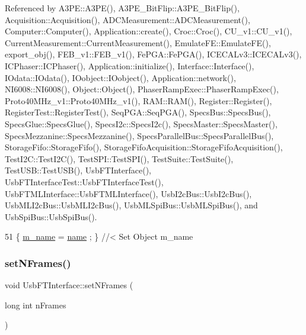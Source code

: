 Referenced by A3\+P\+E\+::\+A3\+P\+E(), A3\+P\+E\+\_\+\+Bit\+Flip\+::\+A3\+P\+E\+\_\+\+Bit\+Flip(), Acquisition\+::\+Acquisition(), A\+D\+C\+Measurement\+::\+A\+D\+C\+Measurement(), Computer\+::\+Computer(), Application\+::create(), Croc\+::\+Croc(), C\+U\+\_\+v1\+::\+C\+U\+\_\+v1(), Current\+Measurement\+::\+Current\+Measurement(), Emulate\+F\+E\+::\+Emulate\+F\+E(), export\+\_\+obj(), F\+E\+B\+\_\+v1\+::\+F\+E\+B\+\_\+v1(), Fe\+P\+G\+A\+::\+Fe\+P\+G\+A(), I\+C\+E\+C\+A\+Lv3\+::\+I\+C\+E\+C\+A\+Lv3(), I\+C\+Phaser\+::\+I\+C\+Phaser(), Application\+::initialize(), Interface\+::\+Interface(), I\+Odata\+::\+I\+Odata(), I\+Oobject\+::\+I\+Oobject(), Application\+::network(), N\+I6008\+::\+N\+I6008(), Object\+::\+Object(), Phaser\+Ramp\+Exec\+::\+Phaser\+Ramp\+Exec(), Proto40\+M\+Hz\+\_\+v1\+::\+Proto40\+M\+Hz\+\_\+v1(), R\+A\+M\+::\+R\+A\+M(), Register\+::\+Register(), Register\+Test\+::\+Register\+Test(), Seq\+P\+G\+A\+::\+Seq\+P\+G\+A(), Specs\+Bus\+::\+Specs\+Bus(), Specs\+Glue\+::\+Specs\+Glue(), Specs\+I2c\+::\+Specs\+I2c(), Specs\+Master\+::\+Specs\+Master(), Specs\+Mezzanine\+::\+Specs\+Mezzanine(), Specs\+Parallel\+Bus\+::\+Specs\+Parallel\+Bus(), Storage\+Fifo\+::\+Storage\+Fifo(), Storage\+Fifo\+Acquisition\+::\+Storage\+Fifo\+Acquisition(), Test\+I2\+C\+::\+Test\+I2\+C(), Test\+S\+P\+I\+::\+Test\+S\+P\+I(), Test\+Suite\+::\+Test\+Suite(), Test\+U\+S\+B\+::\+Test\+U\+S\+B(), Usb\+F\+T\+Interface(), Usb\+F\+T\+Interface\+Test\+::\+Usb\+F\+T\+Interface\+Test(), Usb\+F\+T\+M\+L\+Interface\+::\+Usb\+F\+T\+M\+L\+Interface(), Usb\+I2c\+Bus\+::\+Usb\+I2c\+Bus(), Usb\+M\+L\+I2c\+Bus\+::\+Usb\+M\+L\+I2c\+Bus(), Usb\+M\+L\+Spi\+Bus\+::\+Usb\+M\+L\+Spi\+Bus(), and Usb\+Spi\+Bus\+::\+Usb\+Spi\+Bus().


\begin{DoxyCode}
51 \{ \hyperlink{classObject_a8b83c95c705d2c3ba0d081fe1710f48d}{m\_name}  = \hyperlink{classObject_a300f4c05dd468c7bb8b3c968868443c1}{name}  ; \} \textcolor{comment}{//< Set Object m\_name}
\end{DoxyCode}
\mbox{\label{classUsbFTInterface_a247a19741032fa0f330cc3f6c17ed08b}} 
\subsubsection{\texorpdfstring{set\+N\+Frames()}{setNFrames()}}
{\footnotesize\ttfamily void Usb\+F\+T\+Interface\+::set\+N\+Frames (\begin{DoxyParamCaption}\item[{long int}]{n\+Frames }\end{DoxyParamCaption})\hspace{0.3cm}{\ttfamily [inline]}}

